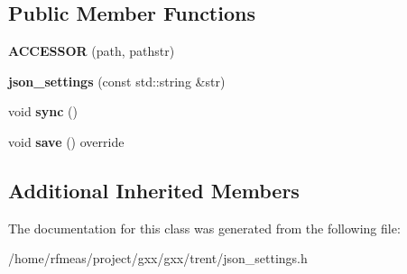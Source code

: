 \subsection*{Public Member Functions}
\begin{DoxyCompactItemize}
\item 
{\bfseries A\+C\+C\+E\+S\+S\+OR} (path, pathstr)\hypertarget{classgxx_1_1json__settings_a6185e6ffd28a9571a7ebbb6b1ebb414d}{}\label{classgxx_1_1json__settings_a6185e6ffd28a9571a7ebbb6b1ebb414d}

\item 
{\bfseries json\+\_\+settings} (const std\+::string \&str)\hypertarget{classgxx_1_1json__settings_a81102ad9328f3b7b81cc634af1f8f44a}{}\label{classgxx_1_1json__settings_a81102ad9328f3b7b81cc634af1f8f44a}

\item 
void {\bfseries sync} ()\hypertarget{classgxx_1_1json__settings_ae5f77725abf4eba9ef8fa099b03c1c6a}{}\label{classgxx_1_1json__settings_ae5f77725abf4eba9ef8fa099b03c1c6a}

\item 
void {\bfseries save} () override\hypertarget{classgxx_1_1json__settings_a14f1136137ea11018fa022eaf43b4802}{}\label{classgxx_1_1json__settings_a14f1136137ea11018fa022eaf43b4802}

\end{DoxyCompactItemize}
\subsection*{Additional Inherited Members}


The documentation for this class was generated from the following file\+:\begin{DoxyCompactItemize}
\item 
/home/rfmeas/project/gxx/gxx/trent/json\+\_\+settings.\+h\end{DoxyCompactItemize}
